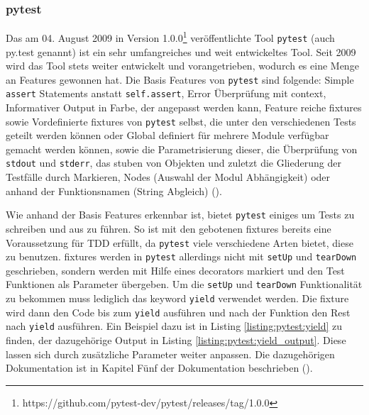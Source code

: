 \subsubsection{pytest}\label{python-tools:pytest}\mbox{}
\newline
Das am 04. August 2009 in Version
1.0.0\footnote{https://github.com/pytest-dev/pytest/releases/tag/1.0.0}
veröffentlichte Tool \lstinline{pytest} (auch py.test genannt)
ist ein sehr umfangreiches und weit entwickeltes Tool. Seit 2009 wird das Tool
stets weiter entwickelt und vorangetrieben, wodurch es eine Menge an Features
gewonnen hat.
\noindent
Die Basis Features von \lstinline{pytest} sind folgende:
Simple \lstinline{assert} Statements anstatt \lstinline{self.assert}, Error
Überprüfung mit \Gls{context}, Informativer Output in Farbe, der angepasst
werden kann, Feature reiche \Glspl{fixture} sowie Vordefinierte \Glspl{fixture}
von \lstinline{pytest} selbst, die unter den verschiedenen Tests geteilt werden
können oder Global definiert für mehrere Module verfügbar gemacht werden
können, sowie die Parametrisierung dieser, die Überprüfung von
\lstinline{stdout} und \lstinline{stderr}, das \gls{stub}en von Objekten und
zuletzt die Gliederung der Testfälle durch Markieren, Nodes (Auswahl der Modul
Abhängigkeit) oder anhand der Funktionsnamen (String Abgleich)
(\cite{docs.pytest.org:4.4}).
\newline

Wie anhand der Basis Features erkennbar ist, bietet \lstinline{pytest} einiges
um Tests zu schreiben und aus zu führen. So ist mit den gebotenen
\Glspl{fixture} bereits eine Voraussetzung für TDD erfüllt, da
\lstinline{pytest} viele verschiedene Arten bietet, diese zu benutzen.
\Glspl{fixture} werden in \lstinline{pytest} allerdings nicht mit
\lstinline{setUp} und \lstinline{tearDown} geschrieben, sondern werden mit Hilfe
eines \glspl{decorator} markiert und den Test Funktionen als Parameter
übergeben. Um die \lstinline{setUp} und \lstinline{tearDown} Funktionalität zu
bekommen muss lediglich das keyword \lstinline{yield} verwendet werden. Die
\Gls{fixture} wird dann den Code bis zum \lstinline{yield} ausführen und nach
der Funktion den Rest nach \lstinline{yield} ausführen. Ein Beispiel dazu ist in
Listing \ref{listing:pytest:yield} zu finden, der dazugehörige Output in
Listing \ref{listing:pytest:yield_output}. Diese lassen sich durch zusätzliche
Parameter weiter anpassen. Die dazugehörigen Dokumentation ist in Kapitel Fünf
der Dokumentation beschrieben (\cite{docs.pytest.org:4.4}).
\newline

